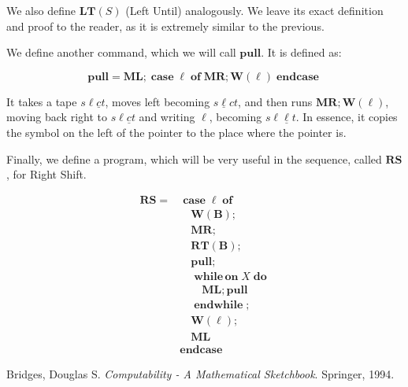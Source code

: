 \documentclass{article}
\newcommand{\B}{\mathbf{B}}
\DeclareMathOperator{\Nwhileon}{\mathbf{while\,on}}
\DeclareMathOperator{\Ndo}{\mathbf{do}}
\DeclareMathOperator{\Nendwhile}{\mathbf{endwhile}}
\DeclareMathOperator{\Ncase}{\mathbf{case}}
\DeclareMathOperator{\Nof}{\mathbf{of}}
\DeclareMathOperator{\Nendcase}{\mathbf{endcase}}
\newcommand{\MR}{\mathbf{MR}}
\newcommand{\ML}{\mathbf{ML}}
\newcommand{\W}{\mathbf{W}}
\newcommand{\RT}{\mathbf{RT}}
\newcommand{\LT}{\mathbf{LT}}
\newcommand{\RS}{\mathbf{RS}}
\newcommand{\pull}{\mathbf{pull}}
\begin{document}
	We also define $\LT(S)$ (Left Until) analogously. We leave its exact definition and proof to the reader, as it is extremely similar to the previous.
	
	We define another command, which we will call $\pull$. It is defined as:
	
	\[\pull = \ML; \Ncase \ell \Nof \MR; \W(\ell) \Nendcase\]
	
	It takes a tape $s \ell \underline c t$, moves left becoming $s \underline \ell c t$, and then runs $\MR; \W(\ell)$, moving back right to $s \ell \underline c t$ and writing $\ell$, becoming $s \ell \underline \ell t$. In essence, it copies the symbol on the left of the pointer to the place where the pointer is.
	
	Finally, we define a program, which will be very useful in the sequence, called $\RS$, for Right Shift.
	
	\begin{align*}
	\RS =& \Ncase \ell \Nof\\
	&\quad \W(\B);\\
	&\quad \MR;\\
	&\quad \RT(\B);\\
	&\quad \pull;\\
	&\quad \Nwhileon X \Ndo\\
	&\quad \quad \ML; \pull\\
	&\quad \Nendwhile;\\
	&\quad \W(\ell);\\
	&\quad \ML\\
	&\Nendcase
	\end{align*}
	
\begin{thebibliography}{9}
Bridges, Douglas S.
\textit{Computability - A Mathematical Sketchbook}. 
Springer, 1994. %
\end{thebibliography}	
\end{document}
